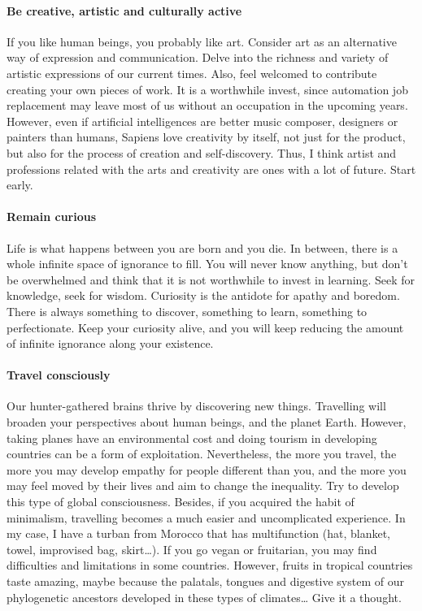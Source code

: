 \documentclass{article}
\begin{document}
\paragraph{Be creative, artistic and culturally active}
If you like human beings, you probably like art. Consider art as an alternative way of expression and communication. Delve into the richness and variety of artistic expressions of our current times. Also, feel welcomed to contribute creating your own pieces of work. It is a worthwhile invest, since automation job replacement may leave most of us without an occupation in the upcoming years. However, even if artificial intelligences are better music composer, designers or painters than humans, Sapiens love creativity by itself, not just for the product, but also for the process of creation and self-discovery. Thus, I think artist and professions related with the arts and creativity are ones with a lot of future. Start early. 

\paragraph{Remain curious}  
Life is what happens between you are born and you die. In between, there is a whole infinite space of ignorance to fill. You will never know anything, but don’t be overwhelmed and think that it is not worthwhile to invest in learning. Seek for knowledge, seek for wisdom. Curiosity is the antidote for apathy and boredom. There is always something to discover, something to learn, something to perfectionate. Keep your curiosity alive, and you will keep reducing the amount of infinite ignorance along your existence. 

\paragraph{Travel consciously} 
Our hunter-gathered brains thrive by discovering new things. Travelling will broaden your perspectives about human beings, and the planet Earth. However, taking planes have an environmental cost and doing tourism in developing countries can be a form of exploitation. Nevertheless, the more you travel, the more you may develop empathy for people different than you, and the more you may feel moved by their lives and aim to change the inequality. Try to develop this type of global consciousness. Besides, if you acquired the habit of minimalism, travelling becomes a much easier and uncomplicated experience. In my case, I have a turban from Morocco that has multifunction (hat, blanket, towel, improvised bag, skirt…). If you go vegan or fruitarian, you may find difficulties and limitations in some countries. However, fruits in tropical countries taste amazing, maybe because the palatals, tongues and digestive system of our phylogenetic ancestors developed in these types of climates… Give it a thought. 
\end{document}
